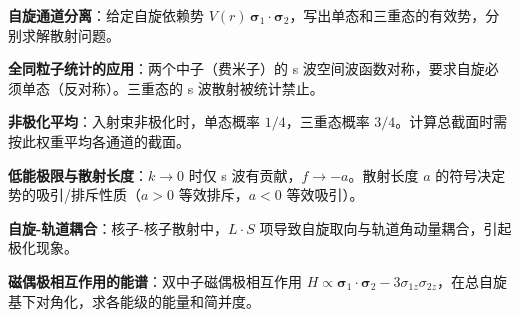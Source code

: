 \begin{drillbox}[训练点与考法变体]
 \textbf{自旋通道分离}：给定自旋依赖势 $V(r)\,\boldsymbol{\sigma}_1\cdot\boldsymbol{\sigma}_2$，写出单态和三重态的有效势，分别求解散射问题。

 \textbf{全同粒子统计的应用}：两个中子（费米子）的 s 波空间波函数对称，要求自旋必须单态（反对称）。三重态的 s 波散射被统计禁止。

 \textbf{非极化平均}：入射束非极化时，单态概率 $1/4$，三重态概率 $3/4$。计算总截面时需按此权重平均各通道的截面。

 \textbf{低能极限与散射长度}：$k\to0$ 时仅 s 波有贡献，$f\to-a$。散射长度 $a$ 的符号决定势的吸引/排斥性质（$a>0$ 等效排斥，$a<0$ 等效吸引）。

 \textbf{自旋-轨道耦合}：核子-核子散射中，$L\cdot S$ 项导致自旋取向与轨道角动量耦合，引起极化现象。

 \textbf{磁偶极相互作用的能谱}：双中子磁偶极相互作用 $H\propto\boldsymbol{\sigma}_1\cdot\boldsymbol{\sigma}_2-3\sigma_{1z}\sigma_{2z}$，在总自旋基下对角化，求各能级的能量和简并度。
\end{drillbox}

